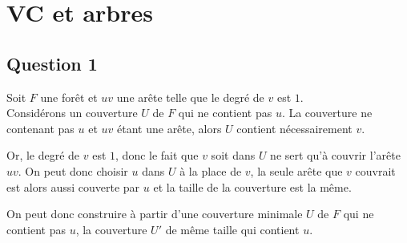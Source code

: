  \section{VC et arbres}
 
  \subsection{Question 1\label{part1q1}}
  Soit $F$ une forêt et $uv$ une arête telle que le degré de $v$ est
  $1$.\\

  Considérons un couverture $U$ de $F$ qui ne contient pas $u$. La
  couverture ne contenant pas $u$ et $uv$ étant une arête, alors $U$
  contient nécessairement $v$.

  Or, le degré de $v$ est $1$, donc le fait que $v$ soit dans $U$ ne
  sert qu'à couvrir l'arête $uv$. On peut donc choisir $u$ dans $U$ à la
  place de $v$, la seule arête que $v$ couvrait est alors aussi couverte
  par $u$ et la taille de la couverture est la même.
  
  On peut donc construire à partir d'une couverture minimale $U$ de $F$
  qui ne contient pas $u$, la couverture $U'$ de même taille qui
  contient $u$.\\

  